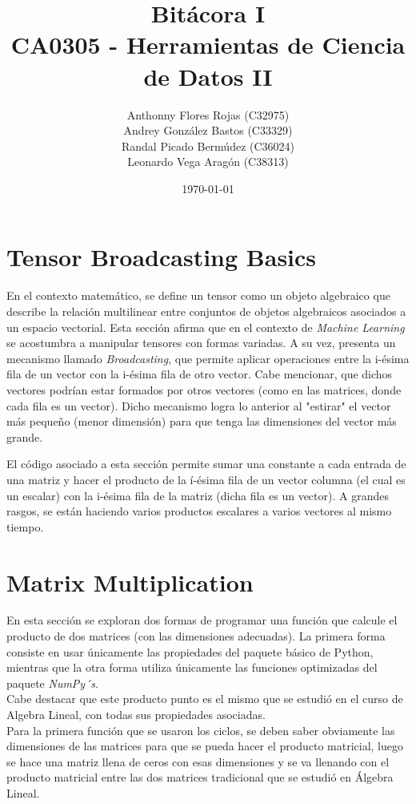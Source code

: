 \documentclass[12pt, letterpaper]{article}
\title
{
    Bitácora I \\[1ex] 
\large CA0305 - Herramientas de Ciencia de Datos II
}
\author{Anthonny Flores Rojas (C32975)\\ Andrey González Bastos (C33329)\\ Randal Picado Bermúdez (C36024)\\ Leonardo Vega Aragón (C38313) }
\date{\today}
\begin{document}
    
\maketitle


\newpage

\section{Tensor Broadcasting Basics}

En el contexto matemático, se define un tensor como un objeto algebraico
que describe la relación multilinear entre conjuntos de objetos algebraicos asociados
a un espacio vectorial. Esta sección afirma que en el contexto de \textit{Machine Learning} 
se acostumbra a manipular tensores con formas variadas. A su vez, presenta un mecanismo llamado \textit{Broadcasting}, que permite 
aplicar operaciones entre la i-ésima fila de un vector con la i-ésima fila de otro vector. Cabe mencionar, que dichos vectores podrían 
estar formados por otros vectores (como en las matrices, donde cada fila es un vector). Dicho mecanismo logra lo anterior al "estirar" el vector más pequeño (menor dimensión) para
que tenga las dimensiones del vector más grande.

El código asociado a esta sección permite sumar una constante a cada entrada de una matriz y hacer el producto de la í-ésima fila de un vector columna (el cual es un escalar) con la i-ésima fila
de la matriz (dicha fila es un vector). A grandes rasgos, se están haciendo varios productos escalares a varios vectores al mismo tiempo.  


\newpage


\section{Matrix Multiplication}

En esta sección se exploran dos formas de programar una función 
que calcule el producto de dos matrices (con las dimensiones adecuadas). La primera forma
consiste en usar únicamente las propiedades del paquete básico de Python, mientras que la otra 
forma utiliza únicamente las funciones optimizadas del paquete \textit{NumPy´s}. \\ 

Cabe destacar que este producto punto es el mismo que se estudió en el curso de Algebra Lineal, con todas
sus propiedades asociadas. \\ 

Para la primera función que se usaron los ciclos, se deben saber obviamente las dimensiones de las matrices para que se pueda hacer el producto matricial, 
luego se hace una matriz llena de ceros con esas dimensiones y se va llenando con el producto matricial entre las dos matrices tradicional que se estudió en Álgebra Lineal. \\ 
\end{document}
